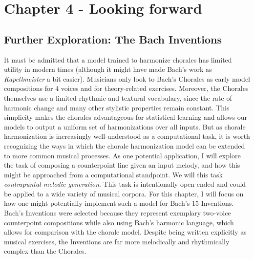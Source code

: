 \documentclass[11pt]{book}
\begin{document}


\chapter{Chapter 4 - Looking forward}

\section{Further Exploration: The Bach Inventions}

It must be admitted that a model trained to harmonize chorales has limited utility in modern times (although it might have made Bach's work as \textit{Kapellmeister} a bit easier). Musicians only look to Bach's Chorales as early model compositions for 4 voices and for theory-related exercises. Moreover, the Chorales themselves use a limited rhythmic and textural vocabulary, since the rate of harmonic change and many other stylistic properties remain constant. This simplicity makes the chorales advantageous for statistical learning and allows our models to output a uniform set of harmonizations over all inputs. But as chorale harmonization is increasingly well-understood as a computational task, it is worth recognizing the ways in which the chorale harmonization model can be extended to more common musical processes. As one potential application, I will explore the task of composing a counterpoint line given an input melody, and how this might be approached from a computational standpoint. We will this task \textit{contrapuntal melodic generation}. This task is intentionally open-ended and could be applied to a wide variety of musical corpora. For this chapter, I will focus on how one might potentially implement such a model for Bach's 15 Inventions. Bach's Inventions were selected because they represent exemplary two-voice counterpoint compositions while also using Bach's harmonic language, which allows for comparison with the chorale model. Despite being written explicitly as musical exercises, the Inventions are far more melodically and rhythmically complex than the Chorales.
\end{document}
